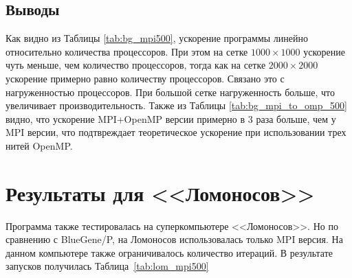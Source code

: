 \documentclass[12pt, a4paper]{article}
\begin{document}
        \subsection{Выводы}
            Как видно из Таблицы \ref{tab:bg_mpi500}, ускорение программы линейно относительно количества процессоров. При этом на сетке $1000 \times 1000$ ускорение чуть меньше, чем количество процессоров, тогда как на сетке $2000 \times 2000$ ускорение примерно равно количеству процессоров. Связано это с нагруженностью процессоров. При большой сетке нагруженность больше, что увеличивает производительность. Также из Таблицы \ref{tab:bg_mpi_to_omp_500} видно, что ускорение MPI+OpenMP версии примерно в 3 раза больше, чем у MPI версии, что подтвреждает теоретическое ускорение при использовании трех нитей OpenMP.

    \section{Результаты для <<Ломоносов>>}
        Программа также тестировалась на суперкомпьютере <<Ломоносов>>. Но по сравнению с BlueGene/P, на Ломоносов использовалась только MPI версия. На данном компьютере также ограничивалось количество итераций. В результате запусков получилась Таблица~\ref{tab:lom_mpi500}
\end{document}
